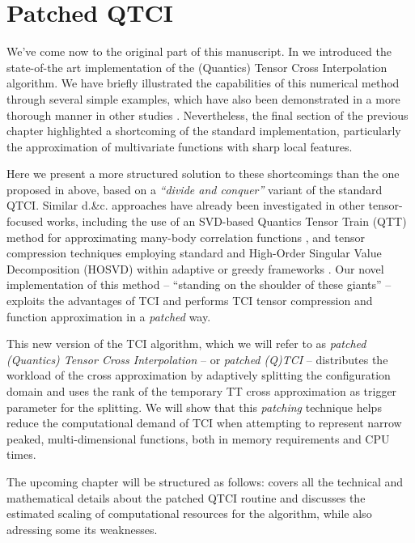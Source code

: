 \chapter{Patched QTCI}
\label{chap:patching}

We've come now to the original part of this manuscript. In  we introduced the state-of-the art implementation of the (Quantics) Tensor Cross Interpolation algorithm. We have briefly illustrated the capabilities of this numerical method through several simple examples, which have also been demonstrated in a more thorough manner in other studies \cite{Fernandez2022, Fernandez2024,
Ritter2024, Jolly2024, Sakurai2025, Oseledets2010, Dolgov2020}. Nevertheless, the final section of the previous chapter highlighted a shortcoming of the standard implementation, particularly the approximation of multivariate functions with sharp local features. 

Here we present a more structured solution to these shortcomings than the one proposed in  above, based on a \textit{``divide and conquer''} variant of the standard QTCI. Similar d.\&c. approaches have already been investigated in other tensor-focused works, including the use of an SVD-based Quantics Tensor Train (QTT) method for approximating many-body correlation functions \cite{Hiroshi2023, Murray2024}, and tensor compression techniques employing standard and High-Order Singular Value Decomposition (HOSVD) within adaptive or greedy frameworks \cite{Ehrlacher2021, FuenteRuizPhDThesis, Ehrlacher2022}. Our novel implementation of this method -- ``standing on the shoulder of these giants'' --  exploits the  advantages of TCI and performs TCI tensor compression and function approximation in a \textit{patched} way. 

This new version of the TCI algorithm, which we will refer to as \textit{patched (Quantics) Tensor Cross Interpolation} -- or \textit{patched (Q)TCI} -- distributes the workload of the cross approximation by adaptively splitting the configuration domain and uses the rank of the temporary TT cross approximation as trigger parameter for the splitting. We will show that this \textit{patching} technique helps reduce the computational demand of TCI when attempting to represent narrow peaked, multi-dimensional functions, both in memory requirements and CPU times. 

The upcoming chapter will be structured as follows:  covers all the technical and mathematical details about the patched QTCI routine and  discusses the estimated scaling of computational resources for the algorithm, while also adressing some its weaknesses.

